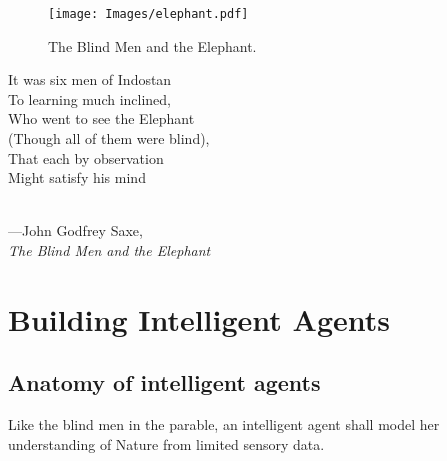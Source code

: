 \documentclass[
  letterpaper,
  12pt,
  british]{tufte-book}
\renewenvironment{quote}{
  \list{}{\leftmargin=3.5cm\topsep=0pt}
  \item\relax\small\itshape
}
{\endlist}
\theoremstyle{plain}
\theoremstyle{definition}
\theoremstyle{plain}
\theoremstyle{remark}
\begin{document}
\newpage{}

\vspace{2cm}

\hypertarget{fig-elephant}{}
\begin{figure}

\texttt{[image: Images/elephant.pdf]}

\label{fig-elephant}The Blind Men and the Elephant.

\end{figure}

\vspace{3cm}

\begin{quote}
It was six men of Indostan\\
To learning much inclined,\\
Who went to see the Elephant\\
(Though all of them were blind),\\
That each by observation\\
Might satisfy his mind\\
\strut \\
---John Godfrey Saxe,\\
\emph{The Blind Men and the Elephant}
\end{quote}

\newpage{}

\hypertarget{building-intelligent-agents}{%
\section{Building Intelligent
Agents}\label{building-intelligent-agents}}

\hypertarget{sec-anatomy_ia}{%
\subsection{Anatomy of intelligent agents}\label{sec-anatomy_ia}}

Like the blind men in the parable, an intelligent agent shall model her
understanding of Nature from limited sensory data.
\end{document}
